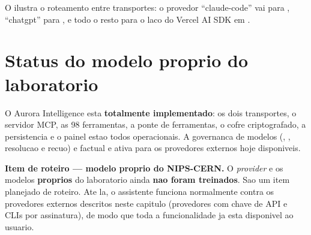 O  ilustra o roteamento entre transportes: o provedor
\enquote{claude-code} vai para , \enquote{chatgpt} para
, e todo o resto para o laco do Vercel AI SDK em
.

\section{Status do modelo proprio do laboratorio}

\label{sec:ia-claude-oneshot}
O Aurora Intelligence esta \textbf{totalmente implementado}: os dois transportes,
o servidor MCP, as 98 ferramentas, a ponte de ferramentas, o cofre criptografado,
a persistencia e o painel estao todos operacionais. A governanca de modelos
(, , resolucao e recuo) e factual e
ativa para os provedores externos hoje disponiveis.

\begin{nota}
\textbf{Item de roteiro --- modelo proprio do NIPS-CERN.} O \emph{provider} e os
modelos \textbf{proprios} do laboratorio ainda \textbf{nao foram treinados}. Sao
um item planejado de roteiro. Ate la, o assistente funciona normalmente contra os
provedores externos descritos neste capitulo (provedores com chave de API e CLIs
por assinatura), de modo que toda a funcionalidade ja esta disponivel ao usuario.
\end{nota}
